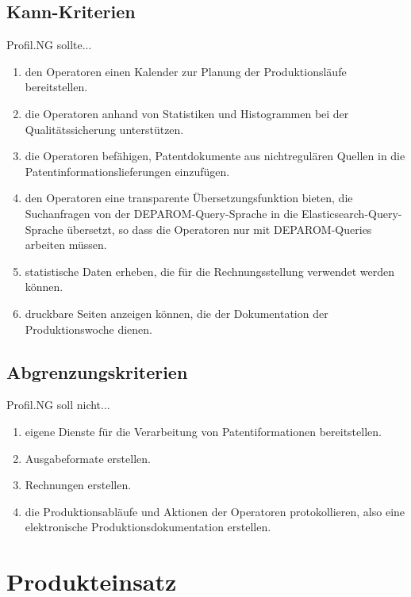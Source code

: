\subsection{Kann-Kriterien}

Profil.NG sollte...

\begin{enumerate}
  \item{den Operatoren einen Kalender zur Planung der Produktionsläufe
        bereitstellen.}
  \item{die Operatoren anhand von Statistiken und Histogrammen bei der
        Qualitätssicherung unterstützen.}
  \item{die Operatoren befähigen, Patentdokumente aus nichtregulären Quellen in
        die Patentinformationslieferungen einzufügen.}
  \item{den Operatoren eine transparente Übersetzungsfunktion bieten, die
        Suchanfragen von der DEPAROM-Query-Sprache in die
        Elasticsearch-Query-Sprache übersetzt, so dass die Operatoren nur mit
        DEPAROM-Queries arbeiten müssen.}
  \item{statistische Daten erheben, die für die Rechnungsstellung verwendet
        werden können.}
  \item{druckbare Seiten anzeigen können, die der Dokumentation der
        Produktionswoche dienen.}
\end{enumerate}

\subsection{Abgrenzungskriterien}

Profil.NG soll nicht...

\begin{enumerate}
  \item{eigene Dienste für die Verarbeitung von Patentiformationen
        bereitstellen.}
  \item{Ausgabeformate erstellen.}
  \item{Rechnungen erstellen.}
  \item{die Produktionsabläufe und Aktionen der Operatoren protokollieren, also
        eine elektronische Produktionsdokumentation erstellen.}
\end{enumerate}

\section{Produkteinsatz}

